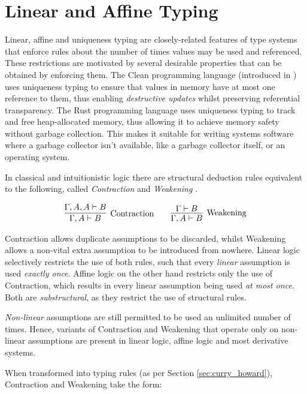 \documentclass[]{unswthesis}
\begin{document}
\section{Linear and Affine Typing}

Linear, affine and uniqueness typing are closely-related features of type systems that enforce rules about the number of times values may be used and referenced. These restrictions are motivated by several desirable properties that can be obtained by enforcing them. The Clean programming language (introduced in \cite{clean87}) uses uniqueness typing to ensure that values in memory have at most one reference to them, thus enabling \textit{destructive updates} whilst preserving referential transparency. The Rust programming language \cite{rustWeb} uses uniqueness typing to track and free heap-allocated memory, thus allowing it to achieve memory safety without garbage collection. This makes it suitable for writing systems software where a garbage collector isn't available, like a garbage collector itself, or an operating system.

In classical and intuitionistic logic there are structural deduction rules equivalent to the following, called \textit{Contraction} and \textit{Weakening} \cite{wadler90, wadler93}.

\begin{eqnarray*}
\infer[\text{Contraction}]{\Gamma, A \vdash B}{
	\Gamma, A, A \vdash B
}
\qquad
\infer[\text{Weakening}]{\Gamma, A \vdash B}{
    \Gamma \vdash B
}
\end{eqnarray*}

Contraction allows duplicate assumptions to be discarded, whilst Weakening allows a non-vital extra assumption to be introduced from nowhere. Linear logic \cite{girard87} selectively restricts the use of both rules, such that every \textit{linear} assumption is used \textit{exactly once}. Affine logic on the other hand restricts only the use of Contraction, which results in every linear assumption being used \textit{at most once}. Both are \textit{substructural}, as they restrict the use of structural rules.

\textit{Non-linear} assumptions are still permitted to be used an unlimited number of times. Hence, variants of Contraction and Weakening that operate only on non-linear assumptions are present in linear logic, affine logic and most derivative systems.

When transformed into typing rules (as per Section \ref{sec:curry_howard}), Contraction and Weakening take the form:
\end{document}

